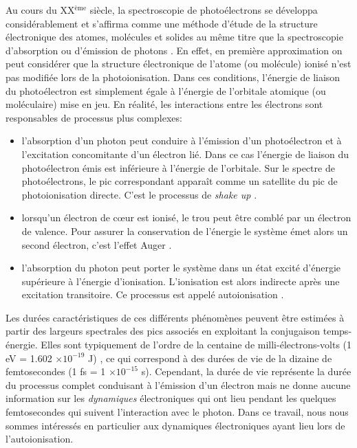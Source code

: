 Au cours du XX$^{\text{ème}}$ siècle, la spectroscopie de photoélectrons se développa considérablement et s'affirma comme une méthode d'étude de la structure électronique des atomes, molécules et solides au même titre que la spectroscopie d'absorption ou d'émission de photons . En effet, en première approximation on peut considérer que la structure électronique de l'atome (ou molécule) ionisé n'est pas modifiée lors de la photoionisation. Dans ces conditions, l'énergie de liaison du photoélectron est simplement égale à l'énergie de l'orbitale atomique (ou moléculaire) mise en jeu. En réalité, les interactions entre les électrons sont responsables de processus plus complexes:
\begin{itemize}
\item l'absorption d'un photon peut conduire à l'émission d'un photoélectron et à l'excitation concomitante d'un électron lié. Dans ce cas l'énergie de liaison du photoélectron émis est inférieure à l'énergie de l'orbitale. Sur le spectre de photoélectrons, le pic correspondant apparaît comme un satellite du pic de photoionisation directe. C'est le processus de \textit{shake up} .
\item lorsqu'un électron de c\oe ur est ionisé, le trou peut être comblé par un électron de valence. Pour assurer la conservation de l'énergie le système émet alors un second électron, c'est l'effet Auger .
\item l'absorption du photon peut porter le système dans un état excité d'énergie supérieure à l'énergie d'ionisation. L'ionisation est alors indirecte après une excitation transitoire. Ce processus est appelé autoionisation .
\end{itemize}
Les durées caractéristiques de ces différents phénomènes peuvent être estimées à partir des largeurs spectrales des pics associés en exploitant la conjugaison temps-énergie. Elles sont typiquement de l'ordre de la centaine de milli-électrons-volts (1 eV = 1.602 $\times 10^{-19}$ J) , ce qui correspond à des durées de vie de la dizaine de femtosecondes (1 fs = 1 $\times 10^{-15}$ s). Cependant, la durée de vie représente la durée du processus complet conduisant à l'émission d'un électron mais ne donne aucune information sur les \textit{dynamiques} électroniques qui ont lieu pendant les quelques femtosecondes qui suivent l'interaction avec le photon. Dans ce travail, nous nous sommes intéressés en particulier aux dynamiques électroniques ayant lieu lors de l'autoionisation.


